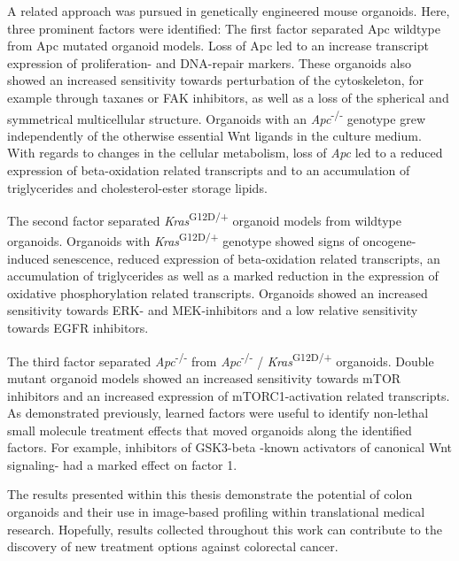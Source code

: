 A related approach was pursued in genetically engineered mouse organoids. Here, three prominent factors were identified: The first factor separated Apc wildtype from Apc mutated organoid models. Loss of Apc led to an increase transcript expression of proliferation- and DNA-repair markers. These organoids also showed an increased sensitivity towards perturbation of the cytoskeleton, for example through taxanes or FAK inhibitors, as well as a loss of the spherical and symmetrical multicellular structure. Organoids with an \textit{Apc}\textsuperscript{-/-} genotype grew independently of the otherwise essential Wnt ligands in the culture medium. With regards to changes in the cellular metabolism, loss of \textit{Apc} led to a reduced expression of beta-oxidation related transcripts and to an accumulation of triglycerides and cholesterol-ester storage lipids.
\bigbreak

The second factor separated \textit{Kras}\textsuperscript{G12D/+} organoid models from wildtype organoids. Organoids with \textit{Kras}\textsuperscript{G12D/+} genotype showed signs of oncogene-induced senescence, reduced expression of beta-oxidation related transcripts, an accumulation of triglycerides as well as a marked reduction in the expression of oxidative phosphorylation related transcripts. Organoids showed an increased sensitivity towards ERK- and MEK-inhibitors and a low relative sensitivity towards EGFR inhibitors. 
\bigbreak

The third factor separated \textit{Apc}\textsuperscript{-/-} from \textit{Apc}\textsuperscript{-/-} / \textit{Kras}\textsuperscript{G12D/+} organoids. Double mutant organoid models showed an increased sensitivity towards mTOR inhibitors and an increased expression of mTORC1-activation related transcripts. As demonstrated previously, learned factors were useful to identify non-lethal small molecule treatment effects that moved organoids along the identified factors. For example, inhibitors of GSK3-beta -known activators of canonical Wnt signaling- had a marked effect on factor 1. 
\bigbreak

The results presented within this thesis demonstrate the potential of colon organoids and their use in image-based profiling within translational medical research. Hopefully, results collected throughout this work can contribute to the discovery of new treatment options against colorectal cancer. 
